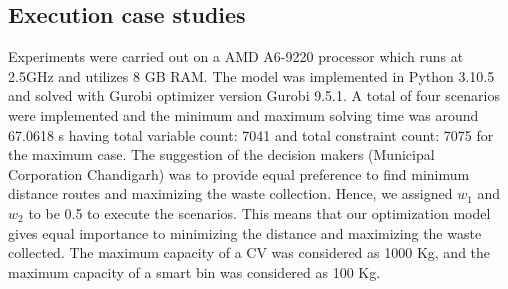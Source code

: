 \documentclass[12pt]{article}
\begin{document}
\subsection{Execution case studies}
Experiments were carried out on a AMD A6-9220 processor which runs at 2.5GHz and utilizes 8 GB RAM. The model was implemented in Python 3.10.5 and solved with Gurobi optimizer version Gurobi 9.5.1. A total of four scenarios were implemented and the minimum and maximum solving time was around 67.0618 s having total variable count: 7041 and total constraint count: 7075 for the maximum case.
The suggestion of the decision makers (Municipal Corporation Chandigarh) was to provide equal preference to find minimum distance routes and maximizing the waste collection. Hence, we assigned  $w_1$ and $w_2$ to be 0.5 to execute the scenarios. This means that our optimization model gives equal importance to minimizing the distance and maximizing the waste collected. The maximum capacity of a CV was considered as 1000 Kg, and the maximum capacity of a smart bin was considered as 100 Kg.
\end{document}
